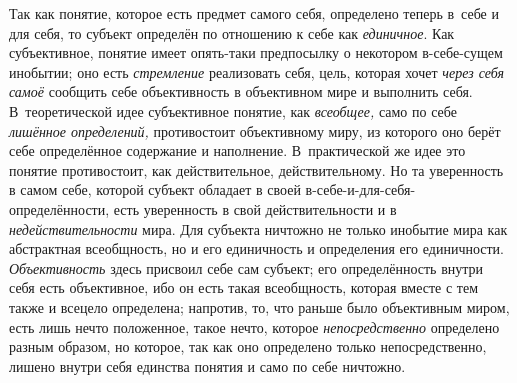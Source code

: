 Так как понятие, которое есть предмет самого себя, определено
теперь в~себе и для себя, то субъект определён по отношению к себе как
{\em единичное}. Как
субъективное, понятие имеет опять-таки предпосылку о некотором в-себе-сущем
инобытии; оно есть {\em стремление}
реализовать себя, цель, которая хочет
{\em через себя самоё}
сообщить себе объективность в объективном мире и выполнить
себя. В~теоретической идее субъективное понятие, как
{\em всеобщее,} само по
себе {\em лишённое определений,}
противостоит объективному миру, из которого оно берёт себе
определённое содержание и наполнение. В~практической же идее это понятие
противостоит, как действительное, действительному. Но та уверенность в
самом себе, которой субъект обладает в своей
в-себе-и-для-себя-определённости, есть уверенность в свой действительности
и в {\em недействительности}
мира. Для субъекта ничтожно не только инобытие мира как
абстрактная всеобщность, но и его единичность и определения его
единичности. {\em Объективность}
здесь присвоил себе сам субъект; его определённость внутри
себя есть объективное, ибо он есть такая всеобщность, которая вместе с тем
также и всецело определена; напротив, то, что раньше было объективным
миром, есть лишь нечто положенное, такое нечто, которое
{\em непосредственно}
определено разным образом, но которое, так как оно определено
только непосредственно, лишено внутри себя единства понятия и само по себе
ничтожно.


